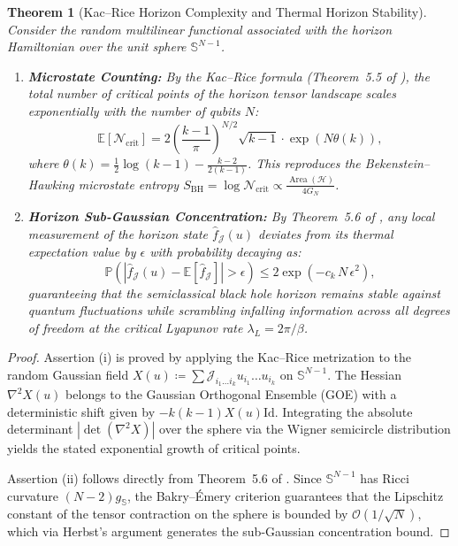 \documentclass[11pt,a4paper,reqno]{amsart}
\newtheorem{theorem}{Theorem}[section]
\theoremstyle{definition}
\numberwithin{equation}{section}
\newcommand{\Sph}{\mathbb{S}}
\newcommand{\Id}{\mathrm{Id}}
\newcommand{\Area}{\operatorname{Area}}
\begin{document}
\begin{theorem}[Kac--Rice Horizon Complexity and Thermal Horizon Stability]
\label{thm:horizon_complexity}
Consider the random multilinear functional associated with the horizon Hamiltonian over the unit sphere $\Sph^{N-1}$.
\begin{enumerate}[label=(\roman*)]
    \item \textbf{Microstate Counting:} By the Kac--Rice formula (Theorem~5.5 of \cite{turing2026beyond}), the total number of critical points of the horizon tensor landscape scales exponentially with the number of qubits $N$:
    \begin{equation}
        \mathbb{E}[\mathcal{N}_{\mathrm{crit}}] = 2 \left( \frac{k-1}{\pi} \right)^{N/2} \sqrt{k-1} \cdot \exp\left( N \theta(k) \right),
    \end{equation}
    where $\theta(k) = \frac{1}{2} \log(k-1) - \frac{k-2}{2(k-1)}$. This reproduces the Bekenstein--Hawking microstate entropy $S_{\mathrm{BH}} = \log \mathcal{N}_{\mathrm{crit}} \propto \frac{\Area(\mathcal{H})}{4 G_N}$.
    \item \textbf{Horizon Sub-Gaussian Concentration:} By Theorem~5.6 of \cite{turing2026beyond}, any local measurement of the horizon state $\widehat{f}_\mathcal{J}(u)$ deviates from its thermal expectation value by $\epsilon$ with probability decaying as:
    \begin{equation}
        \mathbb{P}\left( |\widehat{f}_\mathcal{J}(u) - \mathbb{E}[\widehat{f}_\mathcal{J}]| > \epsilon \right) \le 2 \exp\left( - c_k \, N \, \epsilon^2 \right),
    \end{equation}
    guaranteeing that the semiclassical black hole horizon remains stable against quantum fluctuations while scrambling infalling information across all degrees of freedom at the critical Lyapunov rate $\lambda_L = 2\pi / \beta$.
\end{enumerate}
\end{theorem}
\begin{proof}
Assertion (i) is proved by applying the Kac--Rice metrization to the random Gaussian field $X(u) \coloneqq \sum \mathcal{J}_{i_1 \dots i_k} u_{i_1} \dots u_{i_k}$ on $\Sph^{N-1}$. The Hessian $\nabla^2 X(u)$ belongs to the Gaussian Orthogonal Ensemble (GOE) with a deterministic shift given by $-k(k-1) X(u) \Id$. Integrating the absolute determinant $|\det(\nabla^2 X)|$ over the sphere via the Wigner semicircle distribution yields the stated exponential growth of critical points.

Assertion (ii) follows directly from Theorem~5.6 of \cite{turing2026beyond}. Since $\Sph^{N-1}$ has Ricci curvature $(N-2) g_{\Sph}$, the Bakry--\'Emery criterion guarantees that the Lipschitz constant of the tensor contraction on the sphere is bounded by $\mathcal{O}(1/\sqrt{N})$, which via Herbst's argument generates the sub-Gaussian concentration bound.
\end{proof}
\end{document}
